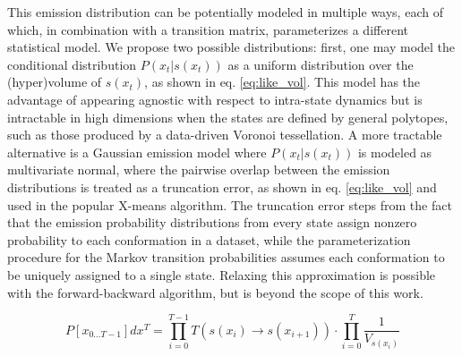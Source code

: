 \documentclass[twocolumn,floatfix,nofootinbib,aps]{revtex4-1}
\begin{document}
This emission distribution can be potentially modeled in multiple ways, each of which, in combination with a transition matrix, parameterizes a different statistical model. We propose two possible distributions: first, one may model the conditional distribution $P(x_t | s(x_t))$ as a uniform distribution over the (hyper)volume of $s(x_t)$, as shown in eq. \ref{eq:like_vol}. This model has the advantage of appearing agnostic with respect to intra-state dynamics but is intractable in high dimensions when the states are defined by general polytopes, such as those produced by a data-driven Voronoi tessellation. A more tractable alternative is a Gaussian emission model where $P(x_t | s(x_t))$ is modeled as multivariate normal, where the pairwise overlap between the emission distributions is treated as a truncation error, as shown in eq.  \ref{eq:like_vol} and used in the popular X-means algorithm.\cite{Pelleg2000Xmeans} The truncation error steps from the fact that the emission probability distributions from every state assign nonzero probability to each conformation in a dataset, while the parameterization procedure for the Markov transition probabilities assumes each conformation to be uniquely assigned to a single state. Relaxing this approximation is possible with the forward-backward algorithm,\cite{Rabiner1989Tutorial} but is beyond the scope of this work.


\begin{equation}
\label{eq:like_vol}
P[x_{0...T-1}] dx^T = \prod_{i=0}^{T-1} T(s(x_i) \rightarrow s(x_{i+1})) \cdot \prod_{i=0}^T \frac{1}{V_{s(x_{i})}}
\end{equation}
\end{document}
